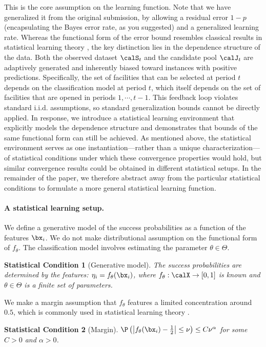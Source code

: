\documentclass[11pt]{article}
\newtheorem{stat}{Statistical Condition}[]
\begin{document}
This is the core assumption on the learning function. Note that we have generalized it from the original submission, by allowing a residual error $1-p$ (encapsulating the Bayes error rate, as you suggested) and a generalized learning rate. Whereas the functional form of the error bound resembles classical results in statistical learning theory \citep{boucheron2005theory, vapnik2015uniform, bousquet2002stability, feldman2019high}, the key distinction lies in the dependence structure of the data. Both the observed dataset $\calS_t$ and the candidate pool $\calJ_t$ are adaptively generated and inherently biased toward instances with positive predictions. Specifically, the set of facilities that can be selected at period $t$ depends on the classification model at period $t$, which itself depends on the set of facilities that are opened in periods $1,\cdots,t-1$. This feedback loop violates standard i.i.d. assumptions, so standard generalization bounds cannot be directly applied. In response, we introduce a statistical learning environment that explicitly models the dependence structure and demonstrates that bounds of the same functional form can still be achieved. As mentioned above, the statistical environment serves as one instantiation—rather than a unique characterization—of statistical conditions under which these convergence properties would hold, but similar convergence results could be obtained in different statistical setups. In the remainder of the paper, we therefore abstract away from the particular statistical conditions to formulate a more general statistical learning function.

\paragraph{A statistical learning setup.}

We define a generative model of the success probabilities as a function of the features $\bx_{i}$. We do not make distributional assumption on the functional form of $f_\theta$. The classification model involves estimating the parameter $\theta\in\Theta$.
\setcounter{stat}{0}
\begin{stat}[Generative model]\label{ass:known_R1}
The success probabilities are determined by the features: $\eta_{i} = f_\theta(\bx_{i})$, where $f_\theta:\calX\to[0,1]$ is known and $\theta\in\Theta$ is a finite set of parameters. 
\end{stat}

We make a margin assumption that $f_\theta$ features a limited concentration around $0.5$, which is commonly used in statistical learning theory \citep[e.g.,][]{boucheron2005theory, tsybakov2004optimal}.
\begin{stat}[Margin]\label{ass:margin_R1}
$\P\left(\left|f_\theta(\bx_{i})-\frac{1}{2}\right|\leq\nu\right)\leq C \nu^{\alpha}$ for some $C>0$ and $\alpha>0$.
\end{stat}
\end{document}
